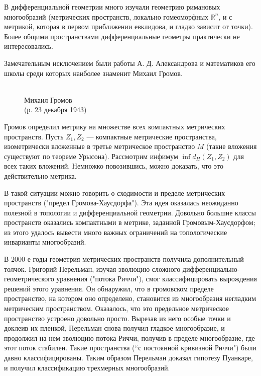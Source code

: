 \documentclass[12pt]{book}
\def\R{{\mathbb R}}
\theoremstyle{upshape}
\theoremstyle{generic}
\theoremstyle{upshapenonumber}
\newcommand{\следствие}{%
     \refstepcounter{teorema}
     {\noindent\bf Следствие \thechapter.\arabic{teorema}:\ }}
\newcommand{\пример}{%
     \refstepcounter{teorema}
     {\noindent\bf Пример \thechapter.\arabic{teorema}:\ }}
\newcommand{\лемма}{%
     \refstepcounter{teorema}
     {\noindent\bf Лемма \thechapter.\arabic{teorema}:\ }}
\newcommand{\теорема}{%
     \refstepcounter{teorema}
     {\noindent\bf Теорема \thechapter.\arabic{teorema}:\ }}
\newcommand{\утверждение}{%
     \refstepcounter{teorema}
     {\noindent\bf Утверждение \thechapter.\arabic{teorema}:\ }}
\begin{document}
В дифференциальной геометрии много изучали 
геометрию римановых многообразий (метрических
пространств, локально гомеоморфных $\R^n$, и с 
метрикой, которая в первом приближении евклидова, и 
гладко зависит от точки). Более общими пространствами 
дифференциальные геометры практически не интересовались.

Замечательным исключением были работы 
А. Д. Александрова и математиков его школы
среди которых наиболее знаменит Михаил Громов.



\begin{figure}[ht]
\begin{center}
\\
Михаил Громов \\
(р. 23 декабря 1943)
\end{center}
\end{figure}


Громов определил метрику на множестве всех компактных
метрических пространств. Пусть $Z_1, Z_2$ --- компактные
метрические пространства, изометрически вложенные
в третье метрическое пространство $M$ (такие вложения
существуют по теореме Урысона). Рассмотрим инфимум
$\inf d_H(Z_1, Z_2)$ для всех таких вложений. 
Немножко повозившись, можно доказать, что это
действительно метрика.

В такой ситуации можно говорить о сходимости и пределе
метрических пространств ("предел Громова-Хаусдорфа"). 
Эта идея оказалась неожиданно
полезной в топологии и дифференциальной геометрии.
Довольно большие классы пространств оказались
компактными в метрике, заданной Громовым-Хаусдорфом;
из этого удалось вывести много важных ограничений
на топологические инварианты многообразий.

В 2000-е годы геометрия метрических пространств
получила дополнительный толчок. Григорий Перельман, изучая эволюцию
сложного диф\-фе\-рен\-ци\-аль\-но-\-ге\-о\-метрического уравнения
("потока Риччи"), смог классифицировать
вырождения решений этого уравнения. Он
обнаружил, что в громовском пределе 
пространство, на котором оно определено,
становится из многообразия негладким
метрическим пространством. Оказалось, 
что это предельное метрическое пространство 
устроено довольно просто. Вырезав из него
особые точки и доклеив их пленкой, Перельман снова 
получил гладкое многообразие, и продолжил на
нем эволюцию потока Риччи, получив
в пределе многообразие, где этот
поток стабилен. Такие пространства (``с постоянной
кривизной Риччи") были давно классифицированы. 
Таким образом Перельман доказал гипотезу Пуанкаре,
и получил классификацию трехмерных
многообразий.
\end{document}
